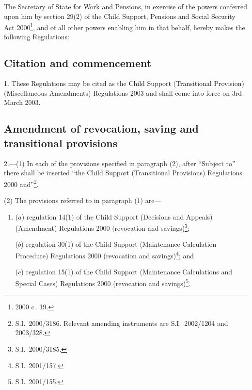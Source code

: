 \documentclass[12pt,a4paper]{article}
\title{\regstitle}
\author{S.I.\ 2003 No.\ 347}
\date{Made
22nd February 2003\\
Laid before Parliament
26th February 2003\\
Coming into force
3rd March 2003
}
\begin{document}
\maketitle

\noindent
The Secretary of State for Work and Pensions, in exercise of the powers conferred upon him by section 29(2) of the Child Support, Pensions and Social Security Act 2000\footnote{2000 c.\ 19.}, and of all other powers enabling him in that behalf, hereby makes the following Regulations: 

\enlargethispage{\baselineskip}

{\sloppy

\tableofcontents

}

\bigskip

\setcounter{secnumdepth}{-2}

\subsection[1. Citation and commencement]{Citation and commencement}

1.  These Regulations may be cited as the Child Support (Transitional Provision) (Miscellaneous Amendments) Regulations 2003 and shall come into force on 3rd March 2003.

\subsection[2. Amendment of revocation, saving and transitional provisions]{Amendment of revocation, saving and transitional provisions}

2.---(1)  In each of the provisions specified in paragraph (2), after “Subject to” there shall be inserted “the Child Support (Transitional Provisions) Regulations 2000 and”\footnote{S.I.\ 2000/3186. Relevant amending instruments are S.I.\ 2002/1204 and 2003/328.}.

(2) The provisions referred to in paragraph (1) are—
\begin{enumerate}\item[]
($a$) regulation 14(1) of the Child Support (Decisions and Appeals) (Amendment) Regulations 2000 (revocation and savings)\footnote{S.I.\ 2000/3185.};

($b$) regulation 30(1) of the Child Support (Maintenance Calculation Procedure) Regulations 2000 (revocation and savings)\footnote{S.I.\ 2001/157.}; and

($c$) regulation 15(1) of the Child Support (Maintenance Calculations and Special Cases) Regulations 2000 (revocation and savings)\footnote{S.I.\ 2001/155.}.
\end{enumerate}
\end{document}
